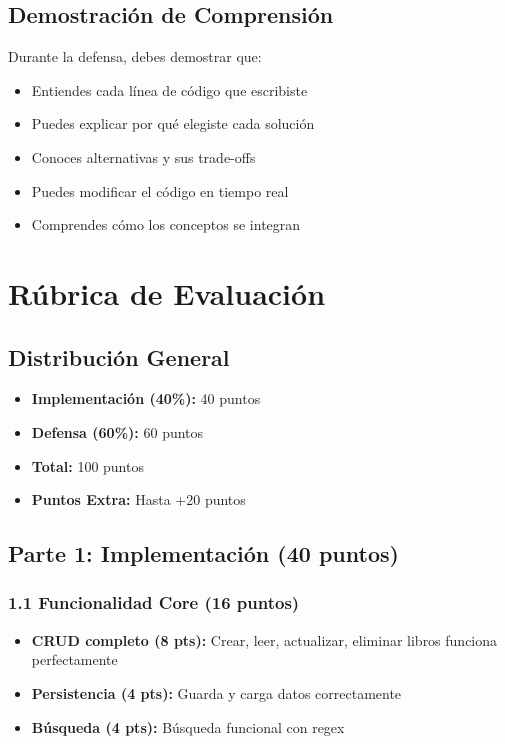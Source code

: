 \documentclass[12pt,a4paper]{article}
\begin{document}
\subsection{Demostración de Comprensión}

Durante la defensa, debes demostrar que:

\begin{itemize}[leftmargin=*]
    \item Entiendes cada línea de código que escribiste
    \item Puedes explicar por qué elegiste cada solución
    \item Conoces alternativas y sus trade-offs
    \item Puedes modificar el código en tiempo real
    \item Comprendes cómo los conceptos se integran
\end{itemize}

\section{Rúbrica de Evaluación}

\subsection{Distribución General}
\begin{itemize}
    \item \textbf{Implementación (40\%):} 40 puntos
    \item \textbf{Defensa (60\%):} 60 puntos
    \item \textbf{Total:} 100 puntos
    \item \textbf{Puntos Extra:} Hasta +20 puntos
\end{itemize}

\subsection{Parte 1: Implementación (40 puntos)}

\subsubsection{1.1 Funcionalidad Core (16 puntos)}
\begin{itemize}[leftmargin=*]
    \item \textbf{CRUD completo (8 pts):} Crear, leer, actualizar, eliminar libros funciona perfectamente
    \item \textbf{Persistencia (4 pts):} Guarda y carga datos correctamente
    \item \textbf{Búsqueda (4 pts):} Búsqueda funcional con regex
\end{itemize}
\end{document}
